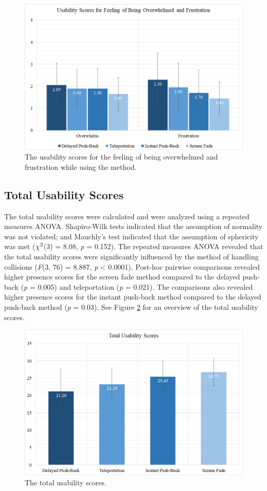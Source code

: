 \begin{figure}[th]
\centering
\includegraphics[width=1\textwidth]{img/overwhelm_frustration_scores.png}
\caption{The usability scores for the feeling of being overwhelmed and frustration while using the method.}
\label{fig:overwhelm_frustration_scores}
\end{figure}

\subsection{Total Usability Scores}

The total usability scores were calculated and were analyzed using a repeated measures ANOVA. Shapiro-Wilk tests indicated that the assumption of normality was not violated; and Mauchly's test indicated that the assumption of sphericity was met (\textit{$\chi\textsuperscript{2}$}(3) = 8.08, \textit{p} = 0.152). The repeated measures ANOVA revealed that the total usability scores were significantly influenced by the method of handling collisions (\textit{F}(3, 76) = 8.887, \textit{p} < 0.0001). Post-hoc pairwise comparisons revealed higher presence scores for the screen fade method compared to the delayed push-back (\textit{p} = 0.005) and teleportation (\textit{p} = 0.021). The comparisons also revealed higher presence scores for the instant push-back method compared to the delayed push-back method (\textit{p} = 0.03). See Figure \ref{fig:total_usability_scores} for an overview of the total usability scores.

\begin{figure}[th]
\centering
\includegraphics[width=1\textwidth]{img/total_usability_scores.png}
\caption{The total usability scores.}
\label{fig:total_usability_scores}
\end{figure}
